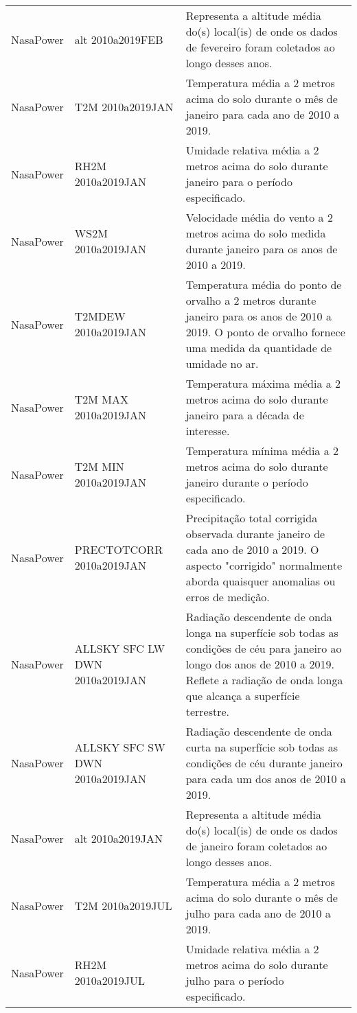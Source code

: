 \begin{longtable}{@{} p{4cm} p{4cm} p{8cm} @{}}
	NasaPower &
	alt 2010a2019FEB &
	Representa a altitude média do(s) local(is) de onde os dados de fevereiro foram coletados ao longo desses anos. \\
	NasaPower &
	T2M 2010a2019JAN &
	Temperatura média a 2 metros acima do solo durante o mês de janeiro para cada ano de 2010 a 2019. \\
	NasaPower &
	RH2M 2010a2019JAN &
	Umidade relativa média a 2 metros acima do solo durante janeiro para o período especificado. \\
	NasaPower &
	WS2M 2010a2019JAN &
	Velocidade média do vento a 2 metros acima do solo medida durante janeiro para os anos de 2010 a 2019. \\
	NasaPower &
	T2MDEW 2010a2019JAN &
	Temperatura média do ponto de orvalho a 2 metros durante janeiro para os anos de 2010 a 2019. O ponto de orvalho fornece uma medida da quantidade de umidade no ar. \\
	NasaPower &
	T2M MAX 2010a2019JAN &
	Temperatura máxima média a 2 metros acima do solo durante janeiro para a década de interesse. \\
	NasaPower &
	T2M MIN 2010a2019JAN &
	Temperatura mínima média a 2 metros acima do solo durante janeiro durante o período especificado. \\
	NasaPower &
	PRECTOTCORR 2010a2019JAN &
	Precipitação total corrigida observada durante janeiro de cada ano de 2010 a 2019. O aspecto "corrigido" normalmente aborda quaisquer anomalias ou erros de medição. \\
	NasaPower &
	ALLSKY SFC LW DWN 2010a2019JAN &
	Radiação descendente de onda longa na superfície sob todas as condições de céu para janeiro ao longo dos anos de 2010 a 2019. Reflete a radiação de onda longa que alcança a superfície terrestre. \\
	NasaPower &
	ALLSKY SFC SW DWN 2010a2019JAN &
	Radiação descendente de onda curta na superfície sob todas as condições de céu durante janeiro para cada um dos anos de 2010 a 2019. \\
	NasaPower &
	alt 2010a2019JAN &
	Representa a altitude média do(s) local(is) de onde os dados de janeiro foram coletados ao longo desses anos. \\
	NasaPower &
	T2M 2010a2019JUL &
	Temperatura média a 2 metros acima do solo durante o mês de julho para cada ano de 2010 a 2019. \\
	NasaPower &
	RH2M 2010a2019JUL &
	Umidade relativa média a 2 metros acima do solo durante julho para o período especificado. \\

\end{longtable}
